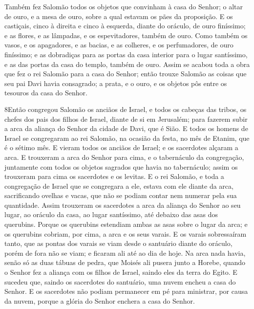 Também fez Salomão todos os objetos que convinham à casa do
Senhor; o altar de ouro, e a mesa de ouro, sobre a qual estavam os
pães da proposição. E os castiçais, cinco à direita e cinco à
esquerda, diante do oráculo, de ouro finíssimo; e as flores, e as
lâmpadas, e os espevitadores, também de ouro. Como também os
vasos, e os apagadores, e as bacias, e as colheres, e os
perfumadores, de ouro finíssimo; e as dobradiças para as portas da
casa interior para o lugar santíssimo, e as das portas da casa do
templo, também de ouro. Assim se acabou toda a obra que fez o
rei Salomão para a casa do Senhor; então trouxe Salomão as coisas
que seu pai Davi havia consagrado; a prata, e o ouro, e os objetos
pôs entre os tesouros da casa do Senhor.

\medskip

\lettrine{8} Então congregou Salomão os anciãos de Israel, e
todos os cabeças das tribos, os chefes dos pais dos filhos de
Israel, diante de si em Jerusalém; para fazerem subir a arca da
aliança do Senhor da cidade de Davi, que é Sião. E todos os
homens de Israel se congregaram ao rei Salomão, na ocasião da festa,
no mês de Etanim, que é o sétimo mês. E vieram todos os anciãos
de Israel; e os sacerdotes alçaram a arca. E trouxeram a arca do
Senhor para cima, e o tabernáculo da congregação, juntamente com
todos os objetos sagrados que havia no tabernáculo; assim os
trouxeram para cima os sacerdotes e os levitas. E o rei Salomão,
e toda a congregação de Israel que se congregara a ele, estava com
ele diante da arca, sacrificando ovelhas e vacas, que não se podiam
contar nem numerar pela sua quantidade. Assim trouxeram os
sacerdotes a arca da aliança do Senhor ao seu lugar, ao oráculo da
casa, ao lugar santíssimo, até debaixo das asas dos querubins.
Porque os querubins estendiam ambas as asas sobre o lugar da
arca; e os querubins cobriam, por cima, a arca e os seus varais.
E os varais sobressaíram tanto, que as pontas dos varais se viam
desde o santuário diante do oráculo, porém de fora não se viam; e
ficaram ali até ao dia de hoje. Na arca nada havia, senão só as
duas tábuas de pedra, que Moisés ali pusera junto a Horebe, quando o
Senhor fez a aliança com os filhos de Israel, saindo eles da terra
do Egito. E sucedeu que, saindo os sacerdotes do santuário,
uma nuvem encheu a casa do Senhor. E os sacerdotes não podiam
permanecer em pé para ministrar, por causa da nuvem, porque a glória
do Senhor enchera a casa do Senhor.

